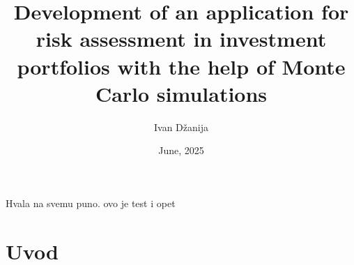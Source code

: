 \documentclass[zavrsnirad]{fer}
\title{Development of an application for risk assessment in investment
portfolios with the help of Monte Carlo simulations}
\author{Ivan Džanija}
\date{June, 2025}
\begin{document}
\renewcommand{\lstlistingname}{Kod}
\renewcommand{\thelstlisting}{\thesection\arabic{lstlisting}}

\maketitle




\begin{zahvale}
	Hvala na svemu puno.
	ovo je test i opet
\end{zahvale}

\mainmatter

\tableofcontents

\chapter{Uvod}
\label{pog:uvod}
\end{document}
